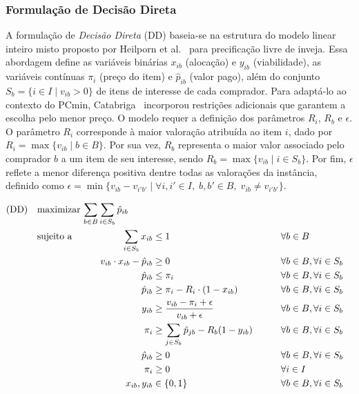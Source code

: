\subsubsection{Formulação de Decisão Direta}

A formulação de \emph{Decisão Direta} (DD) baseia-se na estrutura do modelo linear inteiro misto proposto por Heilporn et al.~\cite{heilporn2010} para precificação livre de inveja. Essa abordagem define as variáveis binárias $x_{ib}$ (alocação) e $y_{ib}$ (viabilidade), as variáveis contínuas $\pi_i$ (preço do item) e $\hat{p}_{ib}$ (valor pago), além do conjunto $S_b = \{i \in I \mid v_{ib} > 0\}$ de itens de interesse de cada comprador. Para adaptá-lo ao contexto do PCmin, Catabriga~\cite{catabriga2025} incorporou restrições adicionais que garantem a escolha pelo menor preço. O modelo requer a definição dos parâmetros $R_i$, $R_b$ e $\epsilon$. O parâmetro $R_i$ corresponde à maior valoração atribuída ao item $i$, dado por $R_i = \max\{v_{ib} \mid b \in B\}$. Por sua vez, $R_b$ representa o maior valor associado pelo comprador $b$ a um item de seu interesse, sendo $R_b = \max\{v_{ib} \mid i \in S_b\}$. Por fim, $\epsilon$ reflete a menor diferença positiva dentre todas as valorações da instância, definido como $\epsilon = \min\{v_{ib} - v_{i'b'} \mid \forall i,i' \in I,\; b,b' \in B,\; v_{ib} \neq v_{i'b'}\}$.

\begin{alignat}{4}
\mathrm{(DD)} \quad & \omit\rlap{maximizar $\displaystyle \sum_{b \in B} \sum_{i \in S_b} \hat{p}_{ib}$} \label{dd_obj}\\
& \text{sujeito a} && \quad & \sum_{i \in S_b} x_{ib} &\leq 1 && \forall b \in B \label{dd_1}\\
&                  &&       & v_{ib} \cdot x_{ib} - \hat{p}_{ib} &\geq 0 &\qquad & \forall b \in B, \forall i \in S_b \label{dd_2}\\
&                  &&       & \hat{p}_{ib} &\leq \pi_i && \forall b \in B, \forall i \in S_b \label{dd_3}\\
&                  &&       & \hat{p}_{ib} &\geq \pi_i - R_i \cdot (1 - x_{ib}) && \forall b \in B, \forall i \in S_b \label{dd_4}\\
&                  &&       & y_{ib} &\geq \frac{v_{ib} - \pi_i + \epsilon}{v_{ib} + \epsilon} && \forall b \in B, \forall i \in S_b \label{dd_viab}\\
&                  &&       & \pi_i &\geq \sum_{j \in S_b} \hat{p}_{jb} - R_b(1 - y_{ib}) && \forall b \in B, \forall i \in S_b \label{dd_pcm}\\
&                  &&       & \hat{p}_{ib} &\geq 0 && \forall b \in B, \forall i \in S_b \label{dd_5}\\
&                  &&       & \pi_i &\geq 0 && \forall i \in I \label{dd_6}\\
&                  &&       & x_{ib}, y_{ib} &\in \{0, 1\} && \forall b \in B, \forall i \in S_b \label{dd_7}
\end{alignat}

